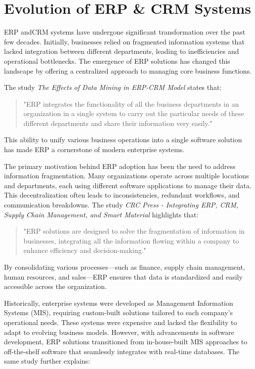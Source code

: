 \section{Evolution of ERP \& CRM Systems}

ERP andCRM systems have undergone significant transformation over the past few decades. Initially, businesses relied on fragmented information systems that lacked integration between different departments, leading to inefficiencies and operational bottlenecks. The emergence of ERP solutions has changed this landscape by offering a centralized approach to managing core business functions. 

The study \textit{The Effects of Data Mining in ERP-CRM Model} states that:  
\begin{quote}
"ERP integrates the functionality of all the business departments in an organization in a single system to carry out the particular needs of these different departments and share their information very easily." \cite{effects_data_mining}
\end{quote}

This ability to unify various business operations into a single software solution has made ERP a cornerstone of modern enterprise systems. 

The primary motivation behind ERP adoption has been the need to address information fragmentation. Many organizations operate across multiple locations and departments, each using different software applications to manage their data. This decentralization often leads to inconsistencies, redundant workflows, and communication breakdowns. The study \textit{CRC Press - Integrating ERP, CRM, Supply Chain Management, and Smart Material} highlights that:  

\begin{quote}
"ERP solutions are designed to solve the fragmentation of information in businesses, integrating all the information flowing within a company to enhance efficiency and decision-making." \cite{crc_erp_integration}
\end{quote}

By consolidating various processes—such as finance, supply chain management, human resources, and sales—ERP ensures that data is standardized and easily accessible across the organization.  

Historically, enterprise systems were developed as Management Information Systems (MIS), requiring custom-built solutions tailored to each company’s operational needs. These systems were expensive and lacked the flexibility to adapt to evolving business models. However, with advancements in software development, ERP solutions transitioned from in-house-built MIS approaches to off-the-shelf software that seamlessly integrates with real-time databases. The same study further explains:

